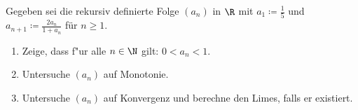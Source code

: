 \begin{prob}[Bonusaufgabe]
  Gegeben sei die rekursiv definierte Folge $(a_n)$ in $\R$ mit
  $a_1 \coloneqq \frac{1}{5}$ und $a_{n+1} \coloneqq \frac{2a_n}{1 + a_n}$ für $n \geq 1$.
  \begin{enumerate}[label=(\alph*)]
  \item Zeige, dass f"ur alle $n \in \N$ gilt: $0<a_n<1$.
  \item Untersuche $(a_n)$ auf Monotonie.
  \item Untersuche $(a_n)$ auf Konvergenz und berechne den Limes, falls er
    existiert.
  \end{enumerate}
\end{prob}
